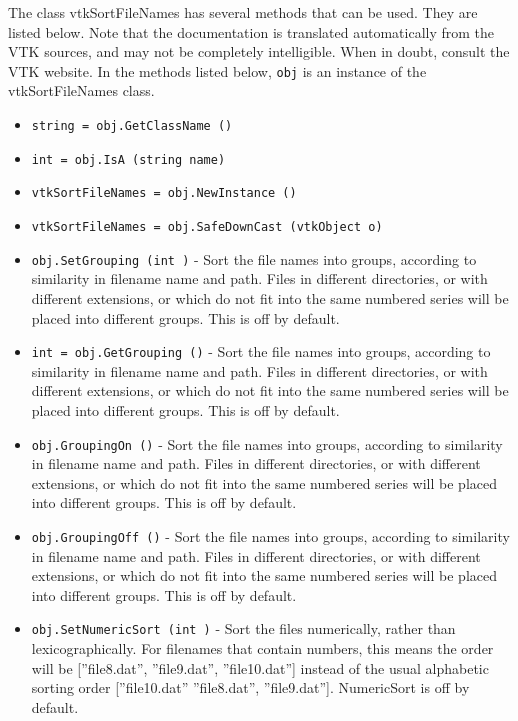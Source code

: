 The class vtkSortFileNames has several methods that can be used.
  They are listed below.
Note that the documentation is translated automatically from the VTK sources,
and may not be completely intelligible.  When in doubt, consult the VTK website.
In the methods listed below, \verb|obj| is an instance of the vtkSortFileNames class.
\begin{itemize}
\item  \verb|string = obj.GetClassName ()|

\item  \verb|int = obj.IsA (string name)|

\item  \verb|vtkSortFileNames = obj.NewInstance ()|

\item  \verb|vtkSortFileNames = obj.SafeDownCast (vtkObject o)|

\item  \verb|obj.SetGrouping (int )| -  Sort the file names into groups, according to similarity in
 filename name and path.  Files in different directories,
 or with different extensions, or which do not fit into the same
 numbered series will be placed into different groups.  This is
 off by default.

\item  \verb|int = obj.GetGrouping ()| -  Sort the file names into groups, according to similarity in
 filename name and path.  Files in different directories,
 or with different extensions, or which do not fit into the same
 numbered series will be placed into different groups.  This is
 off by default.

\item  \verb|obj.GroupingOn ()| -  Sort the file names into groups, according to similarity in
 filename name and path.  Files in different directories,
 or with different extensions, or which do not fit into the same
 numbered series will be placed into different groups.  This is
 off by default.

\item  \verb|obj.GroupingOff ()| -  Sort the file names into groups, according to similarity in
 filename name and path.  Files in different directories,
 or with different extensions, or which do not fit into the same
 numbered series will be placed into different groups.  This is
 off by default.

\item  \verb|obj.SetNumericSort (int )| -  Sort the files numerically, rather than lexicographically.
 For filenames that contain numbers, this means the order will be
 [''file8.dat'', ''file9.dat'', ''file10.dat'']
 instead of the usual alphabetic sorting order
 [''file10.dat'' ''file8.dat'', ''file9.dat''].
 NumericSort is off by default.


\end{itemize}
